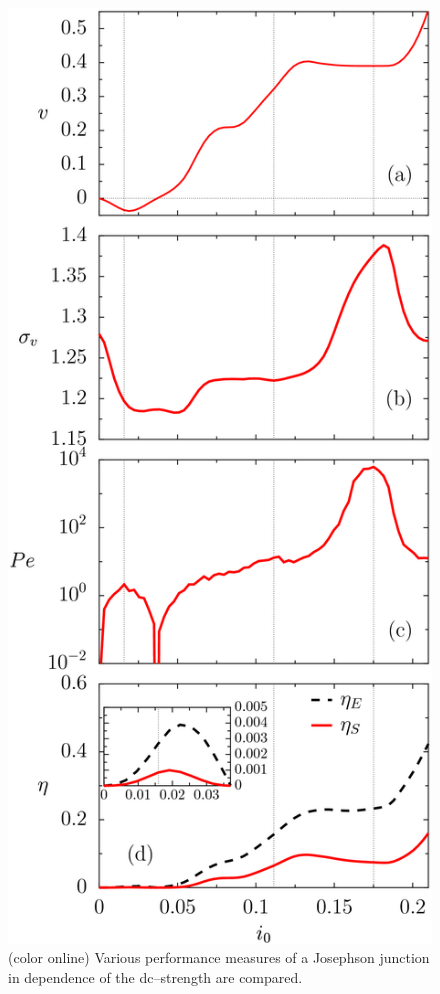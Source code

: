 \documentclass{physeauth}
\begin{document}
\begin{figure}
\includegraphics[scale=0.6]{fig1} 
\caption{(color online) Various performance measures of a
  Josephson  junction in dependence of the dc--strength are compared.
}
\end{figure}
\end{document}
